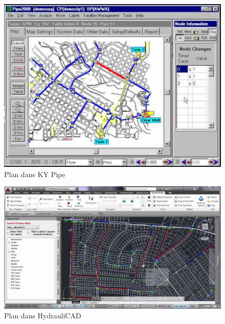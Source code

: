 \documentclass[a4paper, 11pt]{article}
\begin{document}
\begin{minipage}{\linewidth}
      \centering
      \begin{minipage}{0.45\linewidth}
          \begin{figure}[H]
              \includegraphics[width=\linewidth]{Etude_Comparative_1/kypipeplan}
              \caption{Plan dans KY Pipe}
          \end{figure}
      \end{minipage}
      \hspace{0.05\linewidth}
      \begin{minipage}{0.45\linewidth}
          \begin{figure}[H]
              \includegraphics[width=\linewidth]{Etude_Comparative_1/hydraulicadplan}
              \caption{Plan dans HydrauliCAD}
          \end{figure}
      \end{minipage}
  \end{minipage}
\end{document}
